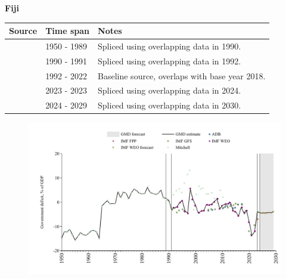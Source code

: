 \documentclass[12pt,a4paper,landscape]{article}
\begin{document}
\begin{adjustbox}{max totalsize={\paperwidth}{\paperheight},center}
\begin{minipage}[t][\textheight][t]{\textwidth}
\vspace*{0.5cm}
{}
\begin{center}
{\Large\bfseries Fiji}
\end{center}
\vspace{0.5cm}
\begin{table}[H]
\centering
\small
\begin{tabular}{|l|l|l|}
\hline
\textbf{Source} & \textbf{Time span} & \textbf{Notes} \\
\hline
\rowcolor{white}\cite{Mitchell}& 1950 - 1989 &Spliced using overlapping data in 1990.\\
\rowcolor{lightgray}\cite{IMF_GFS}& 1990 - 1991 &Spliced using overlapping data in 1992.\\
\rowcolor{white}\cite{IMF_WEO}& 1992 - 2022 &Baseline source, overlaps with base year 2018.\\
\rowcolor{lightgray}\cite{IMF_GFS}& 2023 - 2023 &Spliced using overlapping data in 2024.\\
\rowcolor{white}\cite{IMF_WEO_forecast}& 2024 - 2029 &Spliced using overlapping data in 2030.\\
\hline
\end{tabular}
\end{table}
\begin{figure}[H]
\centering
\includegraphics[width=\textwidth,height=0.6\textheight,keepaspectratio]{graphs/FJI_govdef_GDP.pdf}
\end{figure}
\end{minipage}
\end{adjustbox}
\end{document}
